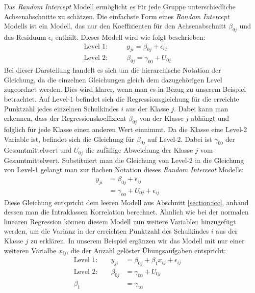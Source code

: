 \documentclass[12pt]{article}\usepackage[]{graphicx}\usepackage[]{color}
\begin{document}
Das \textit{Random Intercept} Modell ermöglicht es für jede Gruppe unterschiedliche Achsenabschnitte zu schätzen. Die einfachste Form eines \textit{Random Intercept} Modells ist ein Modell, das nur den Koeffizienten für den Achsenabschnitt $\beta_{0j}$ und das Residuum $\epsilon_i$ enthält. Dieses Modell wird wie folgt beschrieben:
\begin{equation}
\begin{split}	
\text{Level 1:} & \qquad y_{ji} 	= \beta_{0j} + \epsilon_{ij}\\
\text{Level 2:} & \qquad \beta_{0j} = \gamma_{00} + U_{0j}
\end{split}	
\end{equation} 
Bei dieser Darstellung handelt es sich um die hierarchische Notation der Gleichung, da die einzelnen Gleichungen gleich dem dazugehörigen Level zugeordnet werden. Dies wird klarer, wenn man es in Bezug zu unserem Beispiel betrachtet. Auf Level-1 befindet sich die Regressionsgleichung für die erreichte Punktzahl jedes einzelnen Schulkindes $i$ aus der Klasse $j$. Dabei kann man erkennen, dass der Regressionskoeffizient $\beta_{0j}$ von der Klasse $j$ abhängt und folglich für jede Klasse einen anderen Wert einnimmt. Da die Klasse eine Level-2 Variable ist, befindet sich die Gleichung für $\beta_{0j}$ auf Level-2. Dabei ist $\gamma_{00}$ der Gesamtmittelwert und $U_{0j}$ die zufällige Abweichung der Klasse $j$ vom Gesamtmittelwert. Substituiert man die Gleichung von Level-2 in die Gleichung von Level-1 gelangt man zur flachen Notation dieses \textit{Random Interceot} Modells:
\begin{equation}
\begin{split}
y_{ji} 	& = \beta_{0j} + \epsilon_{ij}\\
		& = \gamma_{00} + U_{0j} + \epsilon_{ij}
\end{split}
\end{equation}
Diese Gleichung entspricht dem leeren Modell aus Abschnitt \ref{section:icc}, anhand dessen man die Intraklassen Korrelation berechnet. Ähnlich wie bei der normalen linearen Regression können diesem Modell nun weitere Variablen hinzugefügt werden, um die Varianz in der erreichten Punktzahl des Schulkindes $i$ aus der Klasse $j$ zu erklären. In unserem Beispiel ergänzen wir das Modell mit nur einer weiteren Varialbe $x_{ij}$, die der Anzahl gelöster Übungsaufgaben entspricht:
\begin{equation} \label{eq:random_intercept_model}
\begin{split}	
 \text{Level 1:}  	\qquad 	y_{ji} 		& = \beta_{0j} + \beta_{1}x_{ij} + \epsilon_{ij}\\
 \text{Level 2:} 	\qquad 	\beta_{0j} 	& = \gamma_{00} + U_{0j}\\
 							\beta_{1} 	& = \gamma_{10}
\end{split}	
\end{equation} 
\end{document}
